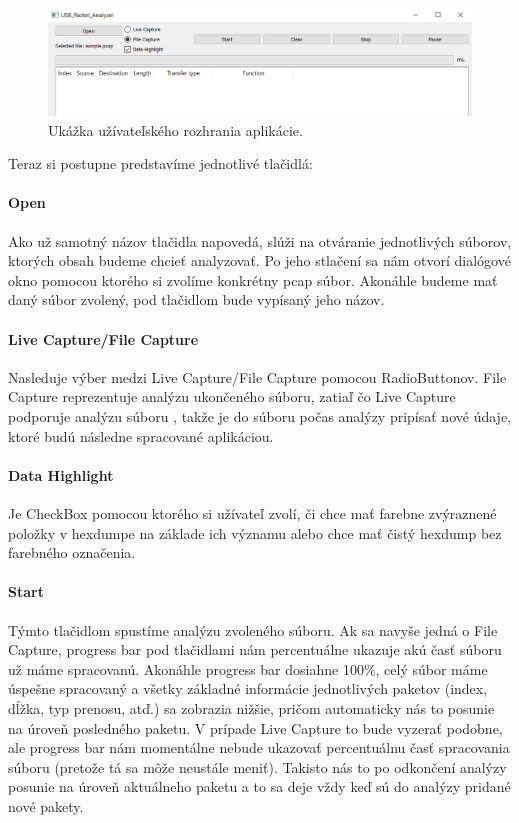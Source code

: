 \begin{figure}[!htb]
	\centering
	\includegraphics[width=\textwidth]{img/kap06_gui}
	\caption{Ukážka užívateľského rozhrania aplikácie.}
	\label{obr:kap6:gui}
\end{figure}

Teraz si postupne predstavíme jednotlivé tlačidlá:

\paragraph{Open} 
\hfill\break
Ako už samotný názov tlačidla napovedá, slúži na otváranie jednotlivých súborov, ktorých obsah budeme chcieť analyzovať.
Po jeho stlačení sa nám otvorí dialógové okno pomocou ktorého si zvolíme konkrétny pcap súbor. Akonáhle budeme mať daný súbor zvolený, pod tlačidlom bude vypísaný jeho názov.

\paragraph{Live Capture/File Capture}
\hfill\break
Nasleduje výber medzi Live Capture/File Capture pomocou RadioButtonov. File Capture reprezentuje analýzu ukončeného súboru, zatiaľ čo Live Capture podporuje analýzu súboru , takže je do súboru počas analýzy pripísať nové údaje, ktoré budú následne spracované aplikáciou.

\paragraph{Data Highlight}
Je CheckBox pomocou ktorého si užívateľ zvolí, či chce mať farebne zvýraznené položky v hexdumpe na základe ich významu alebo chce mať čistý hexdump bez farebného označenia. 

\paragraph{Start}
\hfill\break
Týmto tlačidlom spustíme analýzu zvoleného súboru. Ak sa navyše jedná o File Capture, progress bar pod tlačidlami nám percentuálne ukazuje akú časť súboru už máme spracovanú. Akonáhle progress bar dosiahne 100\%, celý súbor máme úspešne spracovaný a všetky základné informácie jednotlivých paketov (index, dĺžka, typ prenosu, atď.) sa zobrazia nižšie, pričom automaticky nás to posunie na úroveň posledného paketu. V prípade Live Capture to bude vyzerať podobne, ale progress bar nám momentálne nebude ukazovať percentuálnu časť spracovania súboru (pretože tá sa môže neustále meniť). Takisto nás to po odkončení analýzy posunie na úroveň aktuálneho paketu a to sa deje vždy keď sú do analýzy pridané nové pakety.

